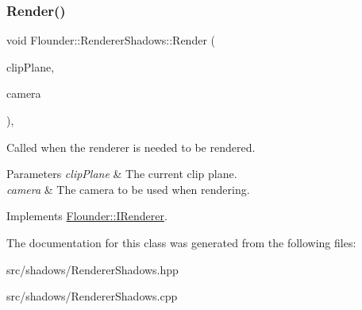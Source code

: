 \subsubsection{\texorpdfstring{Render()}{Render()}}
{\footnotesize\ttfamily void Flounder\+::\+Renderer\+Shadows\+::\+Render (\begin{DoxyParamCaption}\item[{const \hyperlink{class_flounder_1_1_vector4}{Vector4} \&}]{clip\+Plane,  }\item[{const \hyperlink{class_flounder_1_1_i_camera}{I\+Camera} \&}]{camera }\end{DoxyParamCaption})\hspace{0.3cm}{\ttfamily [override]}, {\ttfamily [virtual]}}



Called when the renderer is needed to be rendered. 


\begin{DoxyParams}{Parameters}
{\em clip\+Plane} & The current clip plane. \\
\hline
{\em camera} & The camera to be used when rendering. \\
\hline
\end{DoxyParams}


Implements \hyperlink{class_flounder_1_1_i_renderer_a4e86d6621f6f63442e1c07655afd9daa}{Flounder\+::\+I\+Renderer}.



The documentation for this class was generated from the following files\+:\begin{DoxyCompactItemize}
\item 
src/shadows/Renderer\+Shadows.\+hpp\item 
src/shadows/Renderer\+Shadows.\+cpp\end{DoxyCompactItemize}

